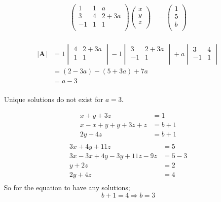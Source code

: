 \documentclass[10pt,oneside,a4paper]{article}
\begin{document}
\begin{enumerate}
\[
\begin{split}
\begin{pmatrix}
1 & 1 & a \\
3 & 4 & 2 + 3a \\
-1 & 1 & 1 \\
\end{pmatrix}
\begin{pmatrix}
x \\
y \\
z \\
\end{pmatrix}
&= 
\begin{pmatrix}
1 \\
5 \\
b \\
\end{pmatrix} \\
\end{split}
\]

\[
\begin{split}
|\mathbf{A}| &= 1\begin{vmatrix} 4 & 2 + 3a \\ 1 & 1 \\ \end{vmatrix} - 1 \begin{vmatrix} 3 & 2 + 3a \\ -1 & 1 \\ \end{vmatrix} + a\begin{vmatrix} 3 & 4 \\ -1 & 1 \\ \end{vmatrix} \\
             &= (2 - 3a) - (5 + 3a) + 7a \\
             &= a - 3 \\
\end{split}
\]

Unique solutions do not exist for $a = 3$.

\[
\begin{split}
x + y + 3z &= 1 \\
x - x + y + y + 3z + z &= b + 1 \\
2y + 4z &= b + 1 \\
\end{split}
\]
\[
\begin{split}
3x + 4y + 11z &= 5 \\
3x - 3x + 4y - 3y + 11z - 9z &= 5 - 3 \\
y + 2z &= 2 \\
2y + 4z &= 4 \\
\end{split}
\]
So for the equation to have any solutions;
\[
b + 1 = 4 \Longrightarrow b = 3
\]


\end{enumerate}
\end{document}
